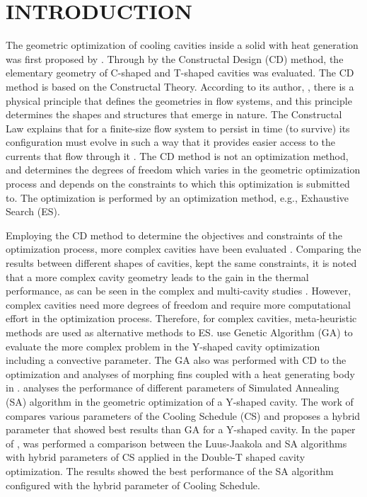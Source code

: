 \documentclass[12pt,fleqn]{article}
\begin{document}
\pagestyle{fancy}

\section{INTRODUCTION}
The geometric optimization of cooling cavities inside a solid with heat generation was first proposed by \cite{Biserni2004}. Through by the Constructal Design (CD) method, the elementary geometry of C-shaped and T-shaped cavities was evaluated. The CD method is based on the Constructal Theory. According to its author, \citep{Bejan}, there is a physical principle that defines the geometries in flow systems, and this principle determines the shapes and structures that emerge in nature. The Constructal Law explains that for a finite-size flow system to persist in time (to survive) its configuration must evolve in such a way that it provides easier access to the currents that flow through it \citep{Bejan}. The CD method is not an optimization method, and determines the degrees of freedom which varies in the geometric optimization process and depends on the constraints to which this optimization is submitted to. The optimization is performed by an optimization method, e.g., Exhaustive Search (ES).

Employing the CD method to determine the objectives and constraints of the optimization process, more complex cavities have been evaluated \citep{Biserni2007}. Comparing the results between different shapes of cavities, kept the same constraints, it is noted that a more complex cavity geometry leads to the gain in the thermal performance, as can be seen in the complex and multi-cavity studies \citep{Lorenzini2012,Xie2010}. However, complex cavities need more degrees of freedom and require more computational effort in the optimization process. Therefore, for complex cavities, meta-heuristic methods are used as alternative methods to ES. \cite{Lorenzini2014} use Genetic Algorithm (GA) to evaluate the more complex problem in the Y-shaped cavity optimization including a convective parameter. The GA also was performed with CD to the optimization and analyses of morphing fins coupled with a heat generating body in \cite{Biserni2017}. \cite{Gonzales2015} analyses the performance of different parameters of Simulated Annealing (SA) algorithm in the geometric optimization of a Y-shaped cavity. The work of \cite{Gonzales2015} compares various parameters of the Cooling Schedule (CS) and proposes a hybrid parameter that showed best results than GA for a Y-shaped cavity. In the paper of \cite{Gonzales2017}, was performed a comparison between the Luus-Jaakola and SA algorithms with hybrid parameters of CS applied in the Double-T shaped cavity optimization. The results showed the best performance of the SA algorithm configured with the hybrid parameter of Cooling Schedule.
\end{document}
